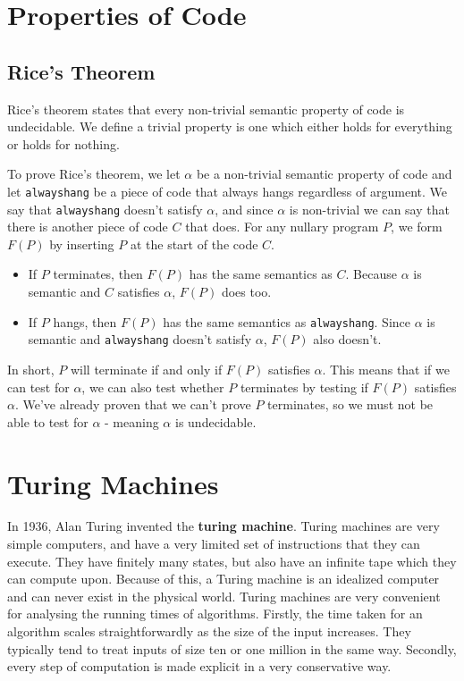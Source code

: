 \documentclass[11pt]{article}
\begin{document}
	\section{Properties of Code}
	
	\subsection{Rice's Theorem}
	Rice's theorem states that every non-trivial semantic property of code is undecidable. We define a trivial property is one which either holds for everything or holds for nothing.
	\par 
	To prove Rice's theorem, we let $\alpha$ be a non-trivial semantic property of code and let \texttt{alwayshang} be a piece of code that always hangs regardless of argument. We say that \texttt{alwayshang} doesn't satisfy $\alpha$, and since $\alpha$ is non-trivial we can say that there is another piece of code $C$ that does. For any nullary program $P$, we form $F(P)$ by inserting $P$ at the start of the code $C$.
	\begin{itemize}
		\item If $P$ terminates, then $F(P)$ has the same semantics as $C$. Because $\alpha$ is semantic and $C$ satisfies $\alpha$, $F(P)$ does too.
		\item If $P$ hangs, then $F(P)$ has the same semantics as \texttt{alwayshang}. Since $\alpha$ is semantic and \texttt{alwayshang} doesn't satisfy $\alpha$, $F(P)$ also doesn't.
	\end{itemize}
	
	In short, $P$ will terminate if and only if $F(P)$ satisfies $\alpha$. This means that if we can test for $\alpha$, we can also test whether $P$ terminates by testing if $F(P)$ satisfies $\alpha$. We've already proven that we can't prove $P$ terminates, so we must not be able to test for $\alpha$ - meaning $\alpha$ is undecidable.
	
	\section{Turing Machines}
	In 1936, Alan Turing invented the \textbf{turing machine}. Turing machines are very simple computers, and have a very limited set of instructions that they can execute. They have finitely many states, but also have an infinite tape which they can compute upon. Because of this, a Turing machine is an idealized computer and can never exist in the physical world. Turing machines are very convenient for analysing the running times of algorithms. Firstly, the time taken for an algorithm scales straightforwardly as the size of the input increases. They typically tend to treat inputs of size ten or one million in the same way. Secondly, every step of computation is made explicit in a very conservative way.
	
\end{document}
